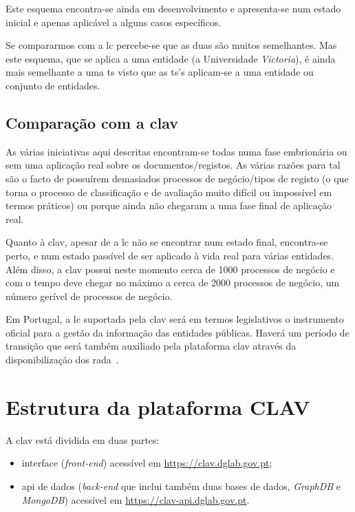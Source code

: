 Este esquema encontra-se ainda em desenvolvimento e apresenta-se num estado inicial e apenas aplicável a alguns 
casos específicos.

Se compararmos com a \acrshort{lc} percebe-se que as duas são muitos semelhantes. 
Mas este esquema, que se aplica a uma entidade (a Universidade \textit{Victoria}), é ainda mais semelhante a 
uma \acrshort{ts} visto que as \acrshort{ts}'s aplicam-se a uma entidade ou conjunto de entidades.

\subsection{Comparação com a \acrshort{clav}}

As várias iniciativas aqui descritas encontram-se todas numa fase embrionária ou sem uma aplicação real sobre os 
documentos/registos. As várias razões para tal são o facto de possuírem demasiados processos de negócio/tipos de 
registo (o que torna o processo de classificação e de avaliação muito difícil ou impossível em termos práticos) 
ou porque ainda não chegaram a uma fase final de aplicação real.

Quanto à \acrshort{clav}, apesar de a \acrshort{lc} não se encontrar num estado final, encontra-se perto, e num 
estado passível de ser aplicado à vida real para várias entidades. Além disso, a \acrshort{clav} possui neste 
momento cerca de 1000 processos de negócio e com o tempo deve chegar no máximo a cerca de 2000 processos de negócio, 
um número gerível de processos de negócio.

Em Portugal, a \acrshort{lc} suportada pela \acrshort{clav} será em termos legislativos o instrumento oficial 
para a gestão da informação das entidades públicas. Haverá um período de transição que será também auxiliado pela 
plataforma \acrshort{clav} através da disponibilização dos \acrshort{rada}~\cite{rada}.

\section{Estrutura da plataforma CLAV}
A \acrshort{clav} está dividida em duas partes:
\begin{itemize}
    \item interface (\textit{front-end}) acessível em \url{https://clav.dglab.gov.pt};
    \item \acrshort{api} de dados (\textit{back-end} que inclui também duas bases de dados, \textit{GraphDB} e 
    \textit{MongoDB}) acessível em \url{https://clav-api.dglab.gov.pt}.
\end{itemize}

